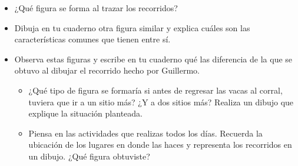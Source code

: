 \documentclass[twoside]{article}
\begin{document}
\begin{itemize}
\item ¿Qué figura se forma al trazar los recorridos?
\item Dibuja en tu cuaderno otra figura similar y explica
cuáles son las características comunes que tienen
entre sí.
\item Observa estas figuras y escribe en tu cuaderno qué las
diferencia de la que se obtuvo al dibujar el recorrido
hecho por Guillermo.
\begin{center}
\end{center}
\begin{itemize}
\item ¿Qué tipo de figura se formaría si antes de regresar las
vacas al corral, tuviera que ir a un sitio más? ¿Y a dos
sitios más? Realiza un dibujo que explique la situación
planteada.
\item Piensa en las actividades que realizas todos los días.
Recuerda la ubicación de los lugares en donde las haces
y representa los recorridos en un dibujo. ¿Qué figura
obtuviste?
\end{itemize}
\end{itemize}
\end{document}

